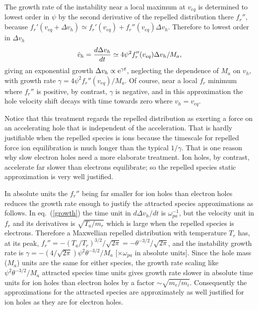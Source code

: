 \documentclass[aip,pop,article-title]{revtex4-2}
\begin{document}
The growth rate of the instability near a local maximum at $v_{eq}$ is
determined to lowest order in $\psi$ by the second derivative of the
repelled distribution there $f_r''$, because
$f_r'(v_{eq}+\Delta v_h)\simeq f_r'(v_{eq})+f_r''(v_{eq}) \Delta v_h$. Therefore to
lowest order in $\Delta v_h$
\begin{equation}
  \label{growth}
  \dot v_h={d\Delta v_h\over dt}  \simeq 4{\psi}^2f_r''(v_{eq})\Delta v_h/M_a,
\end{equation}
giving an exponential growth $\Delta v_h\propto {\rm e}^{\gamma t}$,
neglecting the dependence of $M_a$ on $v_h$, with growth rate
$\gamma=4{\psi}^2f_r''(v_{eq})/M_a$. Of course,
near a local $f_r$ minimum where $f_r''$ is positive, by contrast,
$\gamma$ is negative, and in this approximation the hole velocity
shift decays with time towards zero where $v_h=v_{eq}$. 

Notice that this treatment regards the repelled distribution as
exerting a force on an accelerating hole that is independent of the
acceleration. That is hardly justifiable when the repelled species is
ions because the timescale for repelled force ion equilibration is
much longer than the typical $1/\gamma$. That is one reason why slow
electron holes need a more elaborate treatment\cite{Hutchinson2022}.
Ion holes, by contrast, accelerate far slower than electrons
equilibrate; so the repelled species static approximation is very well
justified.

In absolute units the $f_r''$ being far smaller for ion holes than
electron holes reduces the growth rate enough to justify the attracted
species approximations as follows. In eq.\ (\ref{growth}) the time
unit in $d\Delta v_h/dt$ is $\omega_{pa}^{-1}$, but the velocity unit
in $f_r$ and its derivatives is $\sqrt{T_a/m_r}$ which is large when
the repelled species is electrons. Therefore a Maxwellian repelled
distribution with temperature $T_r$ has, at its peak,
$f_r''=-(T_a/T_r)^{3/2}/\sqrt{2\pi}=-\theta^{-3/2}/\sqrt{2\pi}$, and
the instability growth rate is
$\gamma= -(4/\sqrt{2\pi}){\psi}^2\theta^{-3/2}/M_a$
[$\times \omega_{pa}$ in absolute units]. Since the hole mass ($M_a$)
units are the same for either species, the growth rate scaling like
${\psi}^2\theta^{-3/2}/M_a$ attracted species time units gives growth
rate slower in absolute time units for ion holes than electron holes
by a factor $\sim\sqrt{m_e/m_i}$. Consequently the approximations for
the attracted species are approximately as well justified for ion
holes as they are for electron holes.
\end{document}
